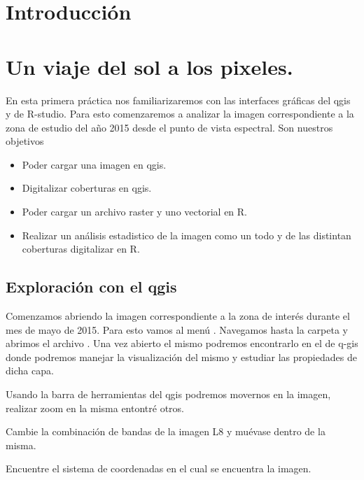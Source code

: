 \documentclass[a4paper]{article}
\begin{document}
\section*{Introducción}
\label{sec:intro}
 
\section{Un viaje del sol a los pixeles.}
\label{sec:fep}
 En esta primera práctica nos familiarizaremos con las interfaces gráficas del
 qgis y de R-studio. Para esto comenzaremos a analizar la imagen correspondiente
 a la zona de estudio del año 2015 desde el punto de vista espectral. Son
 nuestros objetivos

 \begin{itemize}
     \item Poder cargar una imagen en qgis.
     \item Digitalizar coberturas en qgis.
     \item Poder cargar un archivo raster y uno vectorial en R.
     \item Realizar un análisis estadistico de la imagen como un todo y de las
         distintan coberturas digitalizar en R.
 \end{itemize}
\subsection{Exploración con el qgis}
\label{sub:fep:qgis}

 Comenzamos abriendo la imagen  correspondiente a la zona de interés
 durante el mes de mayo de 2015. Para esto vamos al menú . Navegamos hasta la carpeta
  y abrimos el archivo
 . Una vez abierto el mismo podremos encontrarlo en
 el  de q-gis donde podremos manejar la visualización del
 mismo y estudiar las propiedades de dicha capa.

 Usando la barra de herramientas del qgis podremos movernos en la imagen,
 realizar zoom en la misma entontré otros.

 \begin{act} 
     Cambie la combinación de bandas de la imagen L8 y muévase  dentro de la
     misma.
 \end{act}

 \begin{act}
     Encuentre el sistema de coordenadas en el cual se encuentra la imagen.
 \end{act}
 
\end{document}
